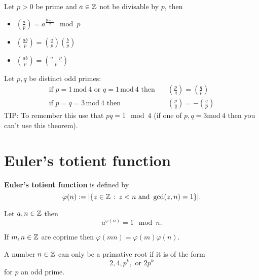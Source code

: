\documentclass{article}
\begin{document}
\begin{theorem}
Let $p>0$ be prime and $a\in\mathbb{Z}$ not be divisable by $p$, then
\begin{itemize}
    \item $\left(\frac{a}{p}\right) = a^{\frac{p-1}{2}} \mod p$
    \item $\left(\frac{ab}{p}\right)=\left(\frac{a}{p}\right)\left(\frac{b}{p}\right)$
    \item $\left(\frac{ab}{p}\right)=\left(\frac{a-p}{p}\right)$
\end{itemize}
\end{theorem}

\begin{theorem}
Let $p,q$ be distinct odd primes:
    \begin{align*}
        \text{if }p=1\,\mathrm{mod}\ 4\text{ or }q=1\,\mathrm{mod}\ 4\text{ then}\quad
          &\left(\frac{p}{q}\right)=\left(\frac{q}{p}\right)\\
        \text{if }p=q=3\,\mathrm{mod}\ 4\text{ then}\quad
          &\left(\frac{p}{q}\right)=-\left(\frac{q}{p}\right)
    \end{align*}
\textsc{TIP:} To remember this use that $pq=1\mod 4$ (if one of $p,q=3\mathrm{mod}\ 4$ then you can't use this theorem).
\end{theorem}

\section*{Euler's totient function}

\begin{definition}
\textbf{Euler's totient function} is defined by
    \[
    \varphi(n) := |\{z\in\mathbb{Z}\,:\,z<n\text{ and }\gcd(z,n)=1\}|.
    \]
\end{definition}

\begin{theorem}[Euler]
Let $a,n\in\mathbb{Z}$ then
    \[
    a^{\varphi(n)} = 1 \mod n.
    \]
\end{theorem}

\begin{theorem}
If $m,n\in\mathbb{Z}$ are coprime then $\varphi(mn)=\varphi(m)\varphi(n)$.
\end{theorem}

\begin{theorem}
A number $n\in\mathbb{Z}$ can only be a primative root if it is of the form
    \[
    2,4,p^k,\text{ or }2p^k
    \]
for $p$ an odd prime.
\end{theorem}
\end{document}
